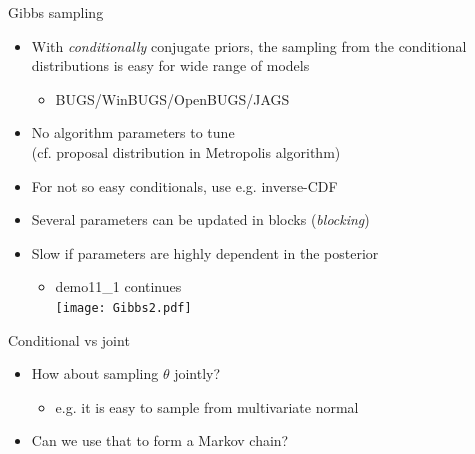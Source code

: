 \documentclass[finnish,english,t]{beamer}
\begin{document}
\begin{frame}{Gibbs sampling}

  \vspace{-0.5\baselineskip}
  \begin{itemize}
  \item With {\it conditionally} conjugate priors, the sampling from
    the conditional distributions is easy for wide range of models
    \begin{itemize}
      \item BUGS/WinBUGS/OpenBUGS/JAGS
    \end{itemize}
  \item<2-> No algorithm parameters to tune\\
    (cf. proposal distribution in Metropolis algorithm)
  \item<3-> For not so easy conditionals, use  e.g. inverse-CDF
  \item<4-> Several parameters can be updated in blocks ({\em blocking})
  \item<5-> Slow if parameters are highly dependent in the posterior
    \begin{itemize}
    \item<5-> demo11\_1 continues\\
      \vspace{-0.5\baselineskip}
      \hspace{3.5cm}\texttt{[image: Gibbs2.pdf]}
    \end{itemize}
  \end{itemize}

\end{frame}

\begin{frame}{Conditional vs joint}

  \begin{itemize}
  \item How about sampling $\theta$ jointly?
    \begin{itemize}
    \item e.g. it is easy to sample from multivariate normal
    \end{itemize}
    \item<2-> Can we use that to form a Markov chain?\\
  \end{itemize}

\end{frame}
\end{document}
